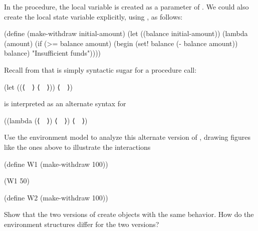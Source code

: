 \begin{exercise}
	\label{Exercise 3.10}
	In the  procedure, the local variable  is created as a parameter of .
	We could also create the local state variable explicitly, using , as follows:
	\begin{scheme}
	  (define (make-withdraw initial-amount)
	    (let ((balance initial-amount))
	      (lambda (amount)
	        (if (>= balance amount)
	            (begin (set! balance (- balance amount))
	                   balance)
	            "Insufficient funds"))))
	\end{scheme}
	Recall from  that  is simply syntactic sugar for a
	procedure call:
	\begin{scheme}
	  (let ((⟨~~⟩ ⟨~~⟩)) ⟨~~⟩)
	\end{scheme}
	is interpreted as an alternate syntax for
	\begin{scheme}
	  ((lambda (⟨~~⟩) ⟨~~⟩) ⟨~~⟩)
	\end{scheme}
	Use the environment model to analyze this alternate version of , drawing figures like the ones above to illustrate the interactions
	\begin{scheme}
	  (define W1 (make-withdraw 100))

	  (W1 50)

	  (define W2 (make-withdraw 100))
	\end{scheme}
	Show that the two versions of  create objects with the same behavior.
	How do the environment structures differ for the two versions?
\end{exercise}
